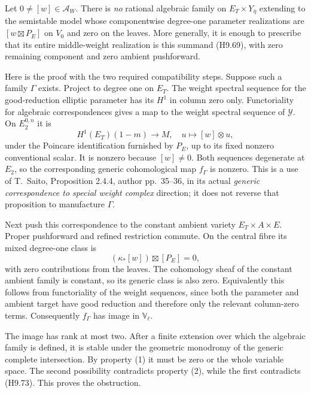 \documentclass[11pt,a4paper]{article}
\begin{document}
Let $0\ne[w]\in\mathcal A_W$. There is \emph{no} rational
algebraic family on $E_T\times Y_{\bar\eta}$ extending to the
semistable model whose componentwise degree-one parameter
realizations are $[w\boxtimes P_E]$ on $V_0$ and zero on the
leaves. More generally, it is enough to prescribe that its entire
middle-weight realization is this summand (H9.69), with zero
remaining component and zero ambient pushforward.

Here is the proof with the two required compatibility steps.
Suppose such a family $\Gamma$ exists. Project to degree one on
$E_T$. The weight spectral sequence for the good-reduction elliptic
parameter has its $H^1$ in column zero only. Functoriality for
algebraic correspondences gives a map to the weight spectral
sequence of $\mathcal Y$. On $E_2^{0,n}$ it is
\[
              H^1(E_T)(1-m)\longrightarrow M,
                       \quad u\longmapsto[w]\otimes u,
                                                               \tag{H9.73}
\]
under the Poincare identification furnished by $P_E$, up to its
fixed nonzero conventional scalar. It is nonzero because $[w]\ne0$.
Both sequences degenerate at $E_2$, so the corresponding generic
cohomological map $f_\Gamma$ is nonzero. This is a use of
T.~Saito, Proposition 2.4.4, author pp.~35--36, in its actual
\emph{generic correspondence to special weight complex} direction;
it does not reverse that proposition to manufacture $\Gamma$.

Next push this correspondence to the constant ambient variety
$E_T\times A\times E$. Proper pushforward and refined restriction
commute. On the central fibre its mixed degree-one class is
\[
             (\kappa_*[w])\boxtimes[P_E]=0,                 \tag{H9.74}
\]
with zero contributions from the leaves. The cohomology sheaf of
the constant ambient family is constant, so its generic class is
also zero. Equivalently this follows from functoriality of the
weight sequences, since both the parameter and ambient target
have good reduction and therefore only the relevant column-zero
terms. Consequently $f_\Gamma$ has image in $\mathbb V_\ell$.

The image has rank at most two. After a finite extension over which
the algebraic family is defined, it is stable under the geometric
monodromy of the generic complete intersection. By property (1) it
must be zero or the whole variable space. The second possibility
contradicts property (2), while the first contradicts (H9.73).
This proves the obstruction.
\end{document}
